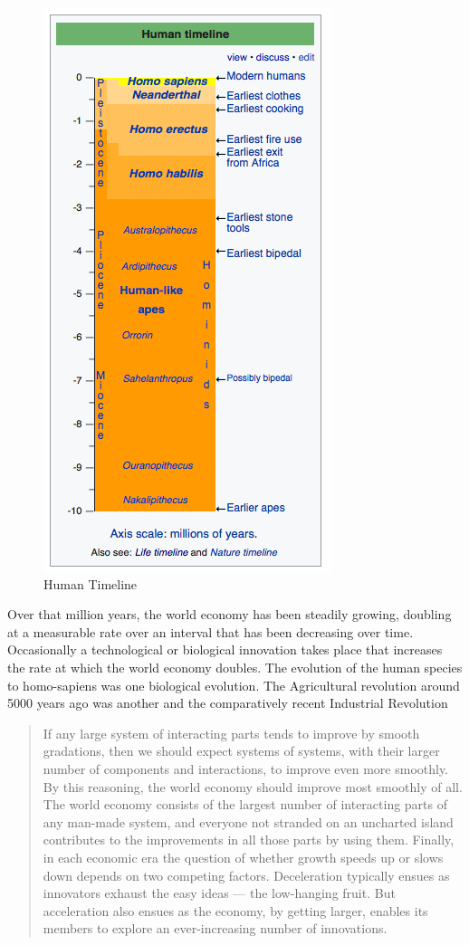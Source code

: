 \begin{figure}
\centering
\includegraphics[scale=0.5]{figures/HumanTimeline.png}
\caption{Human Timeline \cite{RefWorks:279}}
\end{figure}

Over that million years, the world economy has been steadily growing, doubling at a measurable rate over an interval that has been decreasing over time. Occasionally a technological or biological innovation takes place that increases the rate at which the world economy doubles. The evolution of the human species to homo-sapiens was one biological evolution. The Agricultural revolution around 5000 years ago was another and the comparatively recent Industrial Revolution
\begin{quotation}
If any large system of interacting parts tends to improve by smooth gradations,
then we should expect systems of systems, with their larger number of
components and interactions, to improve even more smoothly. By this reasoning,
the world economy should improve most smoothly of all. The world economy
consists of the largest number of interacting
parts of any man-made system, and everyone not stranded on an
uncharted island contributes to the improvements in all those parts by using
them. Finally, in each economic era the question of whether growth speeds up
or slows down depends on two competing factors. Deceleration typically ensues
as innovators exhaust the easy ideas --- the low-hanging fruit. But acceleration
also ensues as the economy, by getting larger, enables its members to explore an
ever-increasing number of innovations\cite{RefWorks:120}.
\end{quotation}

